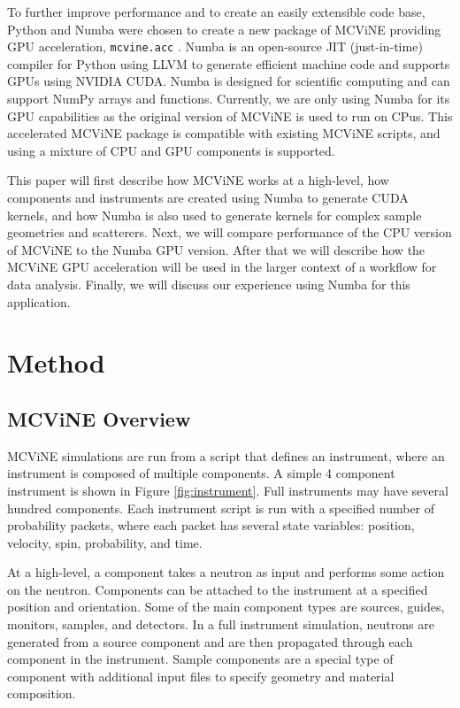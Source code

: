 To further improve performance and to create an easily extensible code base, Python and Numba\cite{lam2015numba} were chosen to create a new package of MCViNE providing GPU acceleration, \texttt{mcvine.acc} \cite{Lin_mcvine_acc}. Numba is an open-source JIT (just-in-time) compiler for Python using LLVM to generate efficient machine code and supports GPUs using NVIDIA CUDA. Numba is designed for scientific computing and can support NumPy arrays and functions. Currently, we are only using Numba for its GPU capabilities as the original version of MCViNE is used to run on CPus. This accelerated MCViNE package is compatible with existing MCViNE scripts, and using a mixture of CPU and GPU components is supported.

This paper will first describe how MCViNE works at a high-level, how components and instruments are created using Numba to generate CUDA kernels, and how Numba is also used to generate kernels for complex sample geometries and scatterers. 
Next, we will compare performance of the CPU version of MCViNE to the Numba GPU version.
After that we will describe how the MCViNE GPU acceleration will be used in the larger context of a workflow for data analysis. 
Finally, we will discuss our experience using Numba for this application.


\section{Method}

\subsection{MCViNE Overview}

MCViNE simulations are run from a script that defines an instrument, where an instrument is composed of multiple components. A simple 4 component instrument is shown in Figure \ref{fig:instrument}. Full instruments may have several hundred components. Each instrument script is run with a specified number of probability packets, where each packet has several state variables: position, velocity, spin, probability, and time.

At a high-level, a component takes a neutron as input and performs some action on the neutron. Components can be attached to the instrument at a specified position and orientation. Some of the main component types are sources, guides, monitors, samples, and detectors. In a full instrument simulation, neutrons are generated from a source component and are then propagated through each component in the instrument. Sample components are a special type of component with additional input files to specify geometry and material composition.


